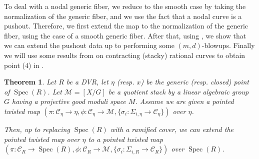 \documentclass{amsart}
\newcommand{\cC}{\mathcal{C}}
\newcommand{\cM}{\mathcal{M}}
\newcommand{\spec}{\operatorname{Spec}}
\newtheorem{Teo}[theorem]{Theorem}
\theoremstyle{definition}
\begin{document}
To deal with a nodal generic fiber, we reduce to the smooth case by taking the normalization of the generic fiber, and we use the fact that a nodal curve is a pushout. Therefore, we first extend the map to the normalization of the generic fiber,  using the case of a smooth generic fiber. After that, using , we show that we can extend the pushout data up to performing some $(m,d)$-blowups. Finally we will use some results from  on contracting (stacky) rational curves to obtain point (4) in .

\begin{Teo}\label{theorem existence part val criterion}
Let $R$ be a DVR, let $\eta$ (resp. $x$) be the generic (resp. closed) point of $\spec(R)$. Let $\cM=[X/G]$ be a quotient stack by a linear algebraic group $G$ having a projective good moduli space $M$.  Assume we are given a pointed twisted map $(\pi:\cC_\eta\to \eta, \phi:\cC_\eta\to \cM,\{\sigma_i : \Sigma_{i,\eta} \to \cC_\eta\})$ over $\eta$.

Then, up to replacing $\spec(R)$ with a ramified cover, we can extend the pointed twisted map over $\eta$ to a pointed twisted map $(\pi:\cC_R\to \spec(R), \phi:\cC_R\to \cM,\{\sigma_i : \Sigma_{i,R} \to \cC_R\})$ over $\spec(R)$.
\end{Teo}
\end{document}
